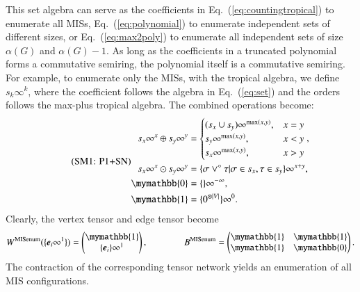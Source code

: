 \documentclass[onefignum, onetabnum]{siamart190516}
\newcommand{\eqname}[1]{\stepcounter{equation}\tag{\theequation : #1}}
\newcommand{\<}{\langle}
\renewcommand{\>}{\rangle}
\newcommand{\Eq}[1]{Eq.~(\ref{#1})}
\newcounter{example}
\begin{document}
This set algebra can serve as the coefficients in \Eq{eq:countingtropical} to enumerate all MISs, \Eq{eq:polynomial} to enumerate independent sets of different sizes,
or \Eq{eq:max2poly} to enumerate all independent sets of size $\alpha(G)$ and $\alpha(G)-1$.
As long as the coefficients in a truncated polynomial forms a commutative semiring, the polynomial itself is a commutative semiring.
For example, to enumerate only the MISs, with the tropical algebra, we define $s_{k}\infty^k$,
where the coefficient follows the algebra in \Eq{eq:set} and the orders follows the max-plus tropical algebra.
The combined operations become: 
\begin{equation}
\eqname{P1+SN}
\begin{split}
    s_x\infty^x \oplus s_y\infty^y &= \begin{cases}
        (s_x \cup s_y)\infty^{\max(x,y)}, & x = y\\
        s_y\infty^{\max(x,y)}, & x < y\\
        s_x\infty^{\max(x,y)}, & x > y
    \end{cases},\\
    s_x\infty^x \odot s_y\infty^y &= \{\sigma \lor^\circ \tau | \sigma \in s_x, \tau \in s_y\}\infty^{x+y},\\
    \mymathbb{0} &= \{\}\infty^{-\infty},\\
    \mymathbb{1} &= \{0^{\otimes |V|}\}\infty^{0}. \label{eq:countingtropicalset}
\end{split}
\end{equation}
Clearly, the vertex tensor and edge tensor become
\begin{equation}
    W^{\rm MISenum}(\{\boldsymbol{e}_{i}\infty^1\}) = \left(\begin{matrix}
        \mymathbb{1} \\
        \{\boldsymbol{e}_{i}\}\infty^1
    \end{matrix}\right),   
    \qquad \qquad
        B^{\rm MISenum} = \left(\begin{matrix}
        \mymathbb{1}  & \mymathbb{1} \\
        \mymathbb{1} & \mymathbb{0}
    \end{matrix}\right).
\end{equation}
The contraction of the corresponding tensor network yields an enumeration of all MIS configurations.
\end{document}
